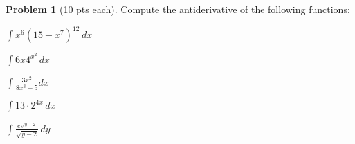 \documentclass[12pt]{article}
\theoremstyle{definition}
\newtheorem{problem}{Problem}
\begin{document}
\bigskip
\begin{problem}[10 pts each]
Compute the antiderivative of the following functions:
\item $\displaystyle{\int x^6 (15 - x^7)^{12}\, dx}$
\vspace{3.5cm}
\item $\displaystyle{\int  6x 4^{x^2} \, dx}$
\vspace{3.5cm}
\item $\displaystyle{\int \frac{3x^2}{8x^3-5} dx}$
\vspace{3.5cm}
\item $\displaystyle{\int 13 \cdot 2^{4x}\, dx}$
\vspace{3.5cm}
\item $\displaystyle{\int \frac{e^{\sqrt{y-2}}}{\sqrt{y-2}}\, dy}$
\vspace{3.5cm}
\end{problem}
\end{document}
